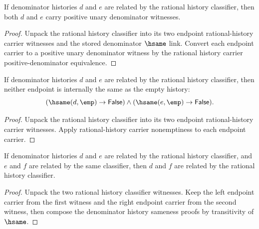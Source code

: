 \begin{theorem}
\label{thm:rat-history-classifier-positive-denominators}
If denominator histories $d$ and $e$ are related by the rational history
classifier, then both $d$ and $e$ carry positive unary denominator witnesses.
\end{theorem}
\begin{proof}
Unpack the rational history classifier into its two endpoint rational-history
carrier witnesses and the stored denominator $\hsame$ link. Convert each
endpoint carrier to a positive unary denominator witness by the rational history
carrier positive-denominator equivalence.
\end{proof}

\begin{theorem}
\label{thm:rat-history-classifier-endpoints-not-empty}
If denominator histories $d$ and $e$ are related by the rational history
classifier, then neither endpoint is internally the same as the empty history:
$$
(\hsame(d,\emp)\to\mathsf{False})\land
(\hsame(e,\emp)\to\mathsf{False}).
$$
\end{theorem}
\begin{proof}
Unpack the rational history classifier into its two endpoint rational-history
carrier witnesses. Apply rational-history carrier nonemptiness to each endpoint
carrier.
\end{proof}

\begin{theorem}
\label{thm:rat-history-classifier-trans}
If denominator histories $d$ and $e$ are related by the rational history
classifier, and $e$ and $f$ are related by the same classifier, then $d$ and
$f$ are related by the rational history classifier.
\end{theorem}
\begin{proof}
Unpack the two rational history classifier witnesses. Keep the left endpoint
carrier from the first witness and the right endpoint carrier from the second
witness, then compose the denominator history sameness proofs by transitivity
of $\hsame$.
\end{proof}

